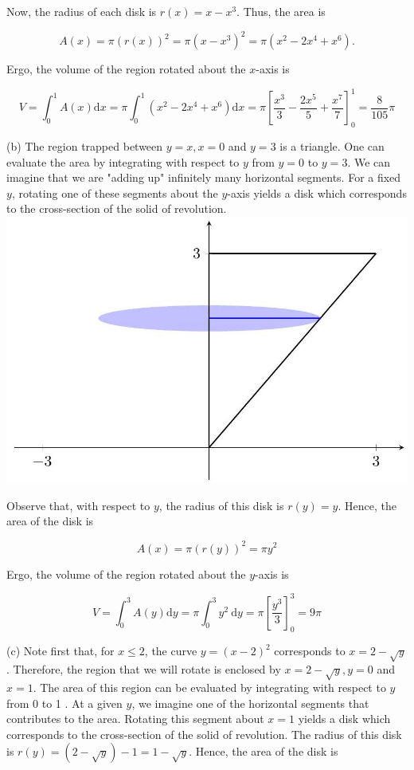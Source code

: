 \documentclass[10pt]{article}
\begin{document}
Now, the radius of each disk is $r(x)=x-x^{3}$. Thus, the area is

$$
A(x)=\pi(r(x))^{2}=\pi\left(x-x^{3}\right)^{2}=\pi\left(x^{2}-2 x^{4}+x^{6}\right) .
$$

Ergo, the volume of the region rotated about the $x$-axis is

$$
V=\int_{0}^{1} A(x) \mathrm{d} x=\pi \int_{0}^{1}\left(x^{2}-2 x^{4}+x^{6}\right) \mathrm{d} x=\pi\left[\frac{x^{3}}{3}-\frac{2 x^{5}}{5}+\frac{x^{7}}{7}\right]_{0}^{1}=\frac{8}{105} \pi
$$

(b) The region trapped between $y=x, x=0$ and $y=3$ is a triangle. One can evaluate the area by integrating with respect to $y$ from $y=0$ to $y=3$. We can imagine that we are "adding up" infinitely many horizontal segments. For a fixed $y$, rotating one of these segments about the $y$-axis yields a disk which corresponds to the cross-section of the solid of revolution.\\
\includegraphics[max width=\textwidth, center]{2024_12_27_3b8e65ac2e3b34a6249eg-7}

Observe that, with respect to $y$, the radius of this disk is $r(y)=y$. Hence, the area of the disk is

$$
A(x)=\pi(r(y))^{2}=\pi y^{2}
$$

Ergo, the volume of the region rotated about the $y$-axis is

$$
V=\int_{0}^{3} A(y) \mathrm{d} y=\pi \int_{0}^{3} y^{2} \mathrm{~d} y=\pi\left[\frac{y^{3}}{3}\right]_{0}^{3}=9 \pi
$$

(c) Note first that, for $x \leq 2$, the curve $y=(x-2)^{2}$ corresponds to $x=2-\sqrt{y}$. Therefore, the region that we will rotate is enclosed by $x=2-\sqrt{y}, y=0$ and $x=1$. The area of this region can be evaluated by integrating with respect to $y$ from 0 to 1 . At a given $y$, we imagine one of the horizontal segments that contributes to the area. Rotating this segment about $x=1$ yields a disk which corresponds to the cross-section of the solid of revolution. The radius of this disk is $r(y)=(2-\sqrt{y})-1=1-\sqrt{y}$. Hence, the area of the disk is
\end{document}

